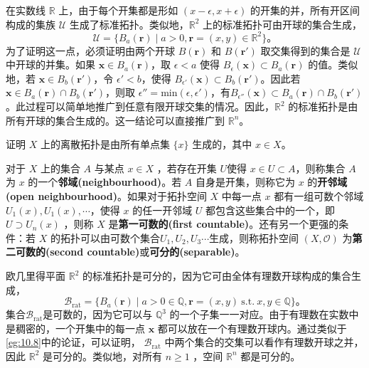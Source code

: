 \begin{theorem}
\begin{theorem}
\begin{eg}\label{eg:10.8}
	在实数线 $\mathbb{R}$ 上，由于每个开集都是形如 $(x-\epsilon ,x+\epsilon )$ 的开集的并，所有开区间构成的集族 $\mathcal{U}$ 生成了标准拓扑。类似地，$\mathbb{R}^{2}$ 上的标准拓扑可由开球的集合生成，
\begin{equation*}
    \mathcal{U} =\{B_{a} (\mathbf{r} )\mid a >0,\mathbf{r} =( x,y) \in \mathbb{R}^{2} \}。
\end{equation*}
为了证明这一点，必须证明由两个开球 $B(\mathbf{r} )$ 和 $B(\mathbf{r} ')$ 取交集得到的集合是 $\mathcal{U}$ 中开球的并集。如果 $\mathbf{x} \in B_{a} (\mathbf{r} )$，取 $\epsilon < a$ 使得 $B_{\epsilon } (\mathbf{x} )\subset B_{a} (\mathbf{r} )$ 的值。类似地，若 $\mathbf{x} \in B_{b} (\mathbf{r} ')$，令 $\epsilon '< b$，使得 $B_{\epsilon '} (\mathbf{x} )\subset B_{b} (\mathbf{r} ')$。因此若 $\mathbf{x} \in B_{a} (\mathbf{r} )\cap B_{b} (\mathbf{r} ')$，则取 $\epsilon ''=\mathrm{min}( \epsilon ,\epsilon ')$，有$B_{\epsilon ''} (\mathbf{x} )\subset B_{a} (\mathbf{r} )\cap B_{b} (\mathbf{r} ')$。此过程可以简单地推广到任意有限开球交集的情况。因此，$\mathbb{R}^{2}$ 的标准拓扑是由所有开球的集合生成的。这一结论可以直接推广到 $\mathbb{R}^{n}$。
\end{eg}

\begin{exercise}
	证明 $X$ 上的离散拓扑是由所有单点集 $\{x\}$ 生成的，其中 $x\in X$。
\end{exercise}

	对于 $X$ 上的集合 $A$ 与某点 $x\in X$ ，若存在开集 $U$使得 $x\in U\subset A$，则称集合 $A$ 为 $x$ 的一个\textbf{邻域(neighbourhood)}。若 $A$ 自身是开集，则称它为 $x$ 的\textbf{开邻域(open neighbourhood)}。如果对于拓扑空间 $X$ 中每一点 $x$ 都有一组可数个邻域 $U_{1}( x) ,U_{1}( x) ,\cdots $，使得 $x$ 的任一开邻域 $U$ 都包含这些集合中的一个，即 $U\supset U_{n}( x)$ ，则称 $X$ 是\textbf{第一可数的(first countable)}。还有另一个更强的条件：若 $X$ 的拓扑可以由可数个集合$U_{1} ,U_{2} ,U_{3} \cdots $生成，则称拓扑空间 $( X,\mathcal{O})$ 为\textbf{第二可数的(second countable)}或\textbf{可分的(separable)}。

\begin{eg}\label{eg:10.9}
	欧几里得平面 $\mathbb{R}^{2}$ 的标准拓扑是可分的，因为它可由全体有理数开球构成的集合生成，
\begin{equation*}
    \mathcal{B}_{\mathrm{rat}} =\{B_{a} (\mathbf{r} )\mid a >0\in \mathbb{Q} ,\mathbf{r} =( x,y) \ \mathrm{s.t.} \ x,y\in \mathbb{Q} \}。
\end{equation*}
集合$\mathcal{B}_{\mathrm{rat}}$是可数的，因为它可以与 $\mathbb{Q}^{3}$ 的一个子集一一对应。由于有理数在实数中是稠密的，一个开集中的每一点 $\mathbf{x}$ 都可以放在一个有理数开球内。通过类似于\ref{eg:10.8}中的论证，可以证明， $\mathcal{B}_{\mathrm{rat}}$ 中两个集合的交集可以看作有理数开球之并，因此 $\mathbb{R}^{2}$ 是可分的。类似地，对所有 $n\geq 1$ ，空间 $\mathbb{R}^{n}$ 都是可分的。
\end{eg}


\end{theorem}
\end{theorem}
